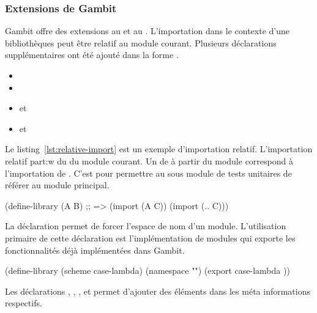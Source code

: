\subsubsection{Extensions de Gambit}

Gambit offre des extensions au  et au .
L'importation dans le contexte d'une bibliothèques peut être relatif au module
courant. Plusieurs déclarations supplémentaires ont été ajouté dans la forme
.

\begin{itemize}
  \item {}
  \item {}
  \item {} et 
  \item {} et 
\end{itemize}


Le listing~\ref{lst:relative-import} est un exemple d'importation
relatif.  L'importation relatif part:w
du  du module courant.
Un  de  à partir du module 
correspond à l'importation de . C'est pour permettre au sous
module de tests unitaires de référer au module principal.\\

\begin{center}
  \begin{mplisting}{0.8}
(define-library (A B)
  ;; => (import (A C))
  (import (.. C)))
\end{mplisting}
\end{center}

La déclaration  permet de forcer l'espace de nom d'un module.
L'utilisation primaire de cette déclaration est l'implémentation de modules qui
exporte les fonctionnalités déjà implémentées dans Gambit. \\

\begin{center}
  \begin{mplisting}{0.8}
(define-library (scheme case-lambda)
  (namespace "")
  (export
case-lambda
))
\end{mplisting}
\end{center}

Les déclarations , , ,
 et  permet d'ajouter des éléments dans les
méta informations respectifs.
